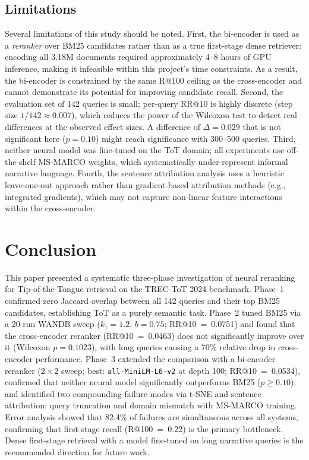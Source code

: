 \documentclass[conference]{IEEEtran}
\begin{document}
\subsection{Limitations}

Several limitations of this study should be noted.
First, the bi-encoder is used as a \textit{reranker} over BM25 candidates rather
than as a true first-stage dense retriever: encoding all 3.18M documents required
approximately 4--8 hours of GPU inference, making it infeasible within this project's
time constraints.
As a result, the bi-encoder is constrained by the same R@100 ceiling as the
cross-encoder and cannot demonstrate its potential for improving candidate recall.
Second, the evaluation set of 142 queries is small; per-query RR@10 is highly discrete
(step size $1/142 \approx 0.007$), which reduces the power of the Wilcoxon test to
detect real differences at the observed effect sizes.
A difference of $\Delta=0.029$ that is not significant here ($p=0.10$) might reach
significance with 300--500 queries.
Third, neither neural model was fine-tuned on the ToT domain; all experiments use
off-the-shelf MS-MARCO weights, which systematically under-represent informal
narrative language.
Fourth, the sentence attribution analysis uses a heuristic leave-one-out approach
rather than gradient-based attribution methods (e.g., integrated gradients), which
may not capture non-linear feature interactions within the cross-encoder.

\section{Conclusion}
\label{sec:conclusion}

This paper presented a systematic three-phase investigation of neural reranking for
Tip-of-the-Tongue retrieval on the TREC-ToT 2024 benchmark.
Phase~1 confirmed zero Jaccard overlap between all 142 queries and their top BM25
candidates, establishing ToT as a purely semantic task.
Phase~2 tuned BM25 via a 20-run WANDB sweep ($k_1=1.2$, $b=0.75$; RR@10~=~0.0751)
and found that the cross-encoder reranker (RR@10~=~0.0463) does not significantly
improve over it (Wilcoxon $p=0.1023$), with long queries causing a 70\% relative
drop in cross-encoder performance.
Phase~3 extended the comparison with a bi-encoder reranker ($2\times2$ sweep;
best: \texttt{all-MiniLM-L6-v2} at depth 100; RR@10~=~0.0534), confirmed that
neither neural model significantly outperforms BM25 ($p \geq 0.10$), and identified
two compounding failure modes via t-SNE and sentence attribution:
query truncation and domain mismatch with MS-MARCO training.
Error analysis showed that 82.4\% of failures are simultaneous across all systems,
confirming that first-stage recall (R@100~=~0.22) is the primary bottleneck.
Dense first-stage retrieval with a model fine-tuned on long narrative queries
is the recommended direction for future work.
\end{document}
